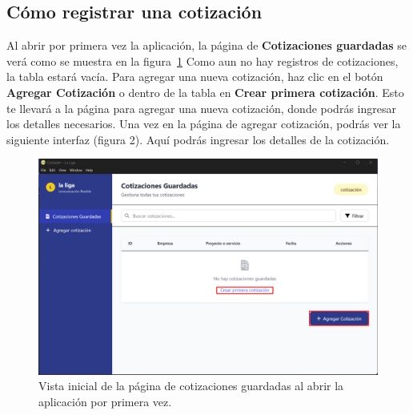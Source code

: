 \documentclass{Pretexto/bluereport}
\begin{document}
\subsection{Cómo registrar una cotización}
Al abrir por primera vez la aplicación, la página de \textbf{Cotizaciones guardadas} se verá como se muestra en la figura~\ref{fig:vista_inicial}
Como aun no hay registros de cotizaciones, la tabla estará vacía. Para agregar una nueva cotización, haz clic en el botón \textbf{Agregar Cotización} o dentro de
la tabla en \textbf{Crear primera cotización}. Esto te llevará a la página para agregar una nueva cotización, donde podrás ingresar los detalles necesarios.
Una vez en la página de agregar cotización, podrás ver la siguiente interfaz (figura 2). Aquí podrás ingresar los detalles de la cotización.
    \begin{figure}[H]
        \centering
            \includegraphics[width=0.85\linewidth]{img/abrir_primera_vez.png}
        \caption{Vista inicial de la página de cotizaciones guardadas al abrir la aplicación por primera vez.}
        \label{fig:vista_inicial}
    \end{figure}
\end{document}
